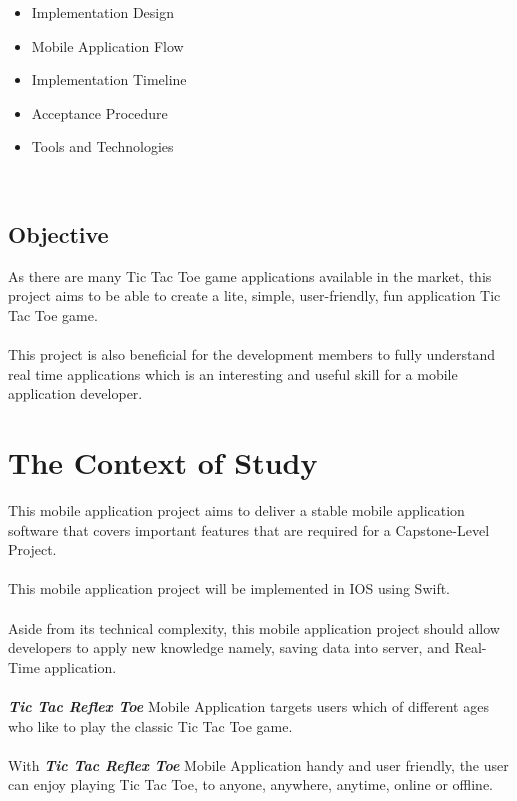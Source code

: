 \documentclass{article}
\begin{document}
    \begin{itemize}
    	\item Implementation Design
    	\item Mobile Application Flow
    	\item Implementation Timeline
    	\item Acceptance Procedure
    	\item Tools and Technologies
    \end{itemize}
    ~\newline
    
    \subsection{Objective}
        As there are many Tic Tac Toe game applications available in the market, this project aims to be able to create a lite, simple, user-friendly, fun application Tic Tac Toe game.
        ~\\\\
        This project is also beneficial for the development members to fully understand real time applications which is an interesting and useful skill for a mobile application developer.
   \newpage

\section{The Context of Study}
    This mobile application project aims to deliver a stable mobile application software that covers important features that are required for a Capstone-Level Project.
    \\\\
    This mobile application project will be implemented in IOS using Swift.
    \\\\
    Aside from its technical complexity, this mobile application project should allow developers to apply new knowledge namely, saving data into server, and Real-Time application.
    \\\\
    \textbf{\emph{Tic Tac Reflex Toe}} Mobile Application targets users which of different ages who like to play the classic Tic Tac Toe game.
    \\\\
    With \textbf{\emph{Tic Tac Reflex Toe}} Mobile Application handy and user friendly, the user can enjoy playing Tic Tac Toe, to anyone, anywhere, anytime, online or offline. 
    ~\\
\end{document}
